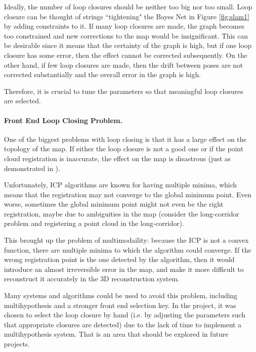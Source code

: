 \documentclass[11pt]{article}
\begin{document}
Ideally, the number of loop closures should be neither too big nor too small. Loop closure can be thought of strings ``tightening" the Bayes Net in Figure \ref{fig:slam1} by adding constraints to it. If many loop closures are made, the graph becomes too constrained and new corrections to the map would be insignificant. This can be desirable since it means that the certainty of the graph is high, but if one loop closure has some error, then the effect cannot be corrected subsequently. On the other hand, if few loop closures are made, then the drift between poses are not corrected substantially and the overall error in the graph is high.
	
Therefore, it is crucial to tune the parameters so that meaningful loop closures are selected. 

\paragraph{Front End Loop Closing Problem.} One of the biggest problems with loop closing is that it has a large effect on the topology of the map. If either the loop closure is not a good one or if the point cloud registration is inaccurate, the effect on the map is disastrous (just as demonstrated in \cite{latif2013robust}).
	
Unfortunately, ICP algorithms are known for having multiple minima, which means that the registration may not converge to the global minimum point. Even worse, sometimes the global minimum point might not even be the right registration, maybe due to ambiguities in the map (consider the long-corridor problem and registering a point cloud in the long-corridor).
	
This brought up the problem of multimodaility: because the ICP is not a convex function, there are multiple minima to which the algorithm could converge. If the wrong registration point is the one detected by the algorithm, then it would introduce an almost irreversible error in the map, and make it more difficult to reconstruct it accurately in the 3D reconstruction system.
	
Many systems and algorithms could be used to avoid this problem, including multihypothesis and a stronger front end selection key. In the project, it was chosen to select the loop closure by hand (i.e. by adjusting the parameters such that appropriate closures are detected) due to the lack of time to implement a multihypothesis system. That is an area that should be explored in future projects.
\end{document}
